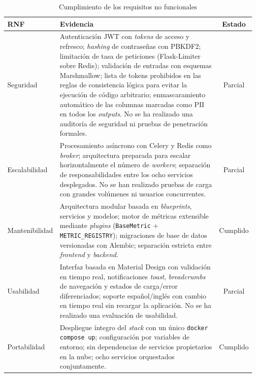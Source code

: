 \begin{table}[htbp]
  \centering
  \caption{Cumplimiento de los requisitos no funcionales}
  \label{tab:rnf-cumplimiento}
  \footnotesize
  \renewcommand{\arraystretch}{1.4}%
  \begin{tabularx}{\textwidth}{l X c}
    \toprule
    \textbf{RNF} & \textbf{Evidencia} & \textbf{Estado} \\
    \midrule
    Seguridad & Autenticación \ac{JWT} con \emph{tokens} de acceso y
      refresco; \emph{hashing} de contraseñas con \ac{PBKDF2}; limitación
      de tasa de peticiones (Flask-Limiter sobre Redis); validación de
      entradas con esquemas Marshmallow; lista de tokens prohibidos en
      las reglas de consistencia lógica para evitar la ejecución de
      código arbitrario; enmascaramiento automático de las columnas
      marcadas como \ac{PII} en todos los \emph{outputs}.  No se ha
      realizado una auditoría de seguridad ni pruebas de penetración
      formales. & Parcial \\
    Escalabilidad & Procesamiento asíncrono con Celery y Redis como
      \emph{broker}; arquitectura preparada para escalar
      horizontalmente el número de \emph{workers}; separación de
      responsabilidades entre los ocho servicios desplegados.  No se han
      realizado pruebas de carga con grandes volúmenes ni usuarios
      concurrentes. & Parcial \\
    Mantenibilidad & Arquitectura modular basada en \emph{blueprints},
      servicios y modelos; motor de métricas extensible mediante
      \emph{plugins} (\texttt{BaseMetric} + \texttt{METRIC\_REGISTRY});
      migraciones de base de datos versionadas con Alembic; separación
      estricta entre \emph{frontend} y \emph{backend}. & Cumplido \\
    Usabilidad & Interfaz basada en Material Design con validación en
      tiempo real, notificaciones \emph{toast}, \emph{breadcrumbs} de
      navegación y estados de carga/error diferenciados; soporte
      español/inglés con cambio en tiempo real sin recargar la
      aplicación.  No se ha realizado una evaluación de usabilidad. & Parcial \\
    Portabilidad & Despliegue íntegro del \emph{stack} con un único
      \texttt{docker\,compose\,up}; configuración por variables de
      entorno; sin dependencias de servicios propietarios en la nube;
      ocho servicios orquestados conjuntamente. & Cumplido \\
    \bottomrule
  \end{tabularx}
\end{table}

